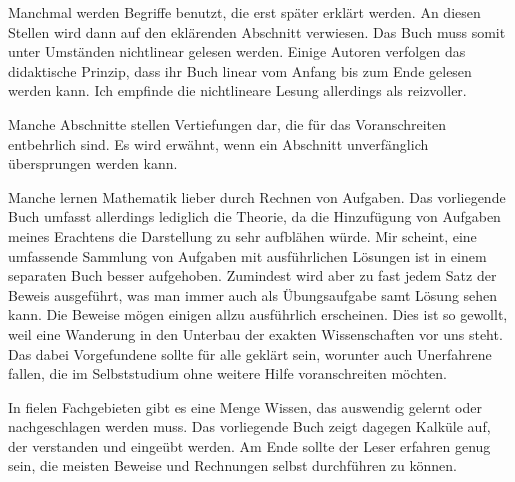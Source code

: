 
Manchmal werden Begriffe benutzt, die erst später erklärt werden.
An diesen Stellen wird dann auf den eklärenden Abschnitt verwiesen.
Das Buch muss somit unter Umständen nichtlinear gelesen werden. Einige
Autoren verfolgen das didaktische Prinzip, dass ihr Buch linear vom Anfang
bis zum Ende gelesen werden kann. Ich empfinde die nichtlineare Lesung
allerdings als reizvoller.

Manche Abschnitte stellen Vertiefungen dar, die für das Voranschreiten
entbehrlich sind. Es wird erwähnt, wenn ein Abschnitt unverfänglich
übersprungen werden kann.

Manche lernen Mathematik lieber durch Rechnen von Aufgaben. Das
vorliegende Buch umfasst allerdings lediglich die Theorie, da
die Hinzufügung von Aufgaben meines Erachtens die Darstellung zu sehr
aufblähen würde. Mir scheint, eine umfassende Sammlung von Aufgaben
mit ausführlichen Lösungen ist in einem separaten Buch besser
aufgehoben. Zumindest wird aber zu fast jedem Satz der Beweis
ausgeführt, was man immer auch als Übungsaufgabe samt Lösung sehen kann.
Die Beweise mögen einigen allzu ausführlich erscheinen. Dies ist so
gewollt, weil eine Wanderung in den Unterbau der exakten Wissenschaften
vor uns steht. Das dabei Vorgefundene sollte für alle geklärt sein,
worunter auch Unerfahrene fallen, die im Selbststudium ohne weitere
Hilfe voranschreiten möchten.

In fielen Fachgebieten gibt es eine Menge Wissen, das auswendig
gelernt oder nachgeschlagen werden muss. Das vorliegende Buch zeigt
dagegen Kalküle auf, der verstanden und eingeübt werden. Am Ende sollte
der Leser erfahren genug sein, die meisten Beweise und Rechnungen
selbst durchführen zu können.

